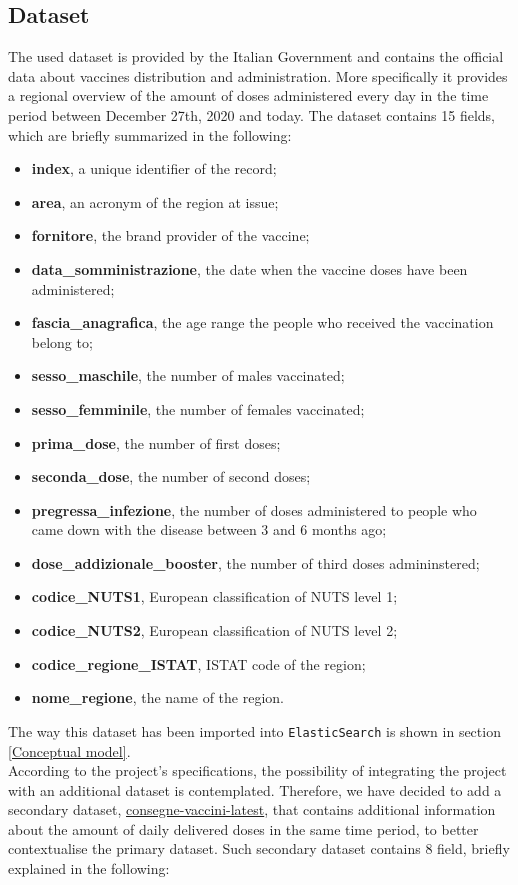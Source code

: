 \documentclass{article}
\begin{document}
\subsection{Dataset}
The used dataset is provided by the Italian Government and contains the official data about vaccines distribution and administration. More specifically it provides a regional overview of the amount of doses administered every day in the time period between December 27th, 2020 and today.
The dataset contains 15 fields, which are briefly summarized in the following:
\begin{itemize}
    \item \textbf{index}, a unique identifier of the record;
    \item \textbf{area}, an acronym of the region at issue;
    \item \textbf{fornitore}, the brand provider of the vaccine; 
    \item \textbf{data\_somministrazione}, the date when the vaccine doses have been administered;
    \item \textbf{fascia\_anagrafica}, the age range the people who received the vaccination belong to;
    \item \textbf{sesso\_maschile}, the number of males vaccinated;
    \item \textbf{sesso\_femminile}, the number of females vaccinated;
    \item \textbf{prima\_dose}, the number of first doses;
    \item \textbf{seconda\_dose}, the number of second doses;
    \item \textbf{pregressa\_infezione}, the number of doses administered to people who came down with the disease between 3 and 6 months ago;
    \item \textbf{dose\_addizionale\_booster}, the number of third doses admininstered;
    \item \textbf{codice\_NUTS1}, European classification of NUTS level 1;
    \item \textbf{codice\_NUTS2}, European classification of NUTS level 2;
    \item \textbf{codice\_regione\_ISTAT}, ISTAT code of the region;
    \item \textbf{nome\_regione}, the name of the region.
\end{itemize}
The way this dataset has been imported into \verb|ElasticSearch| is shown in section \ref{Conceptual model}.\\
According to the project's specifications, the possibility of integrating the project with an additional dataset is contemplated. Therefore, we have decided to add a secondary dataset, \href{https://github.com/italia/covid19-opendata-vaccini/blob/master/dati/consegne-vaccini-latest.csv}{consegne-vaccini-latest}, that contains additional information about the amount of daily delivered doses in the same time period, to better contextualise the primary dataset. Such secondary dataset contains 8 field, briefly explained in the following:
\end{document}
